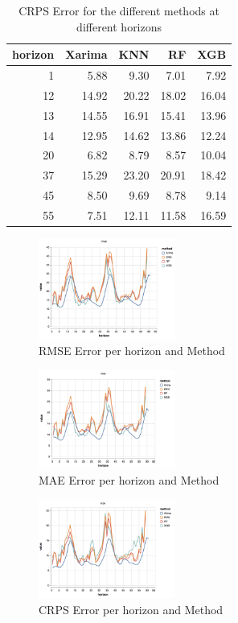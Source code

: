 \documentclass[a4paper,twocolumn,5p]{elsarticle}
\begin{document}
\begin{table}[tbp]
\caption{\label{tab:determ}CRPS Error for the different methods at different
horizons 
}
  \centering
\begin{tabular}{rrrrr}
  \toprule
 horizon & Xarima & KNN & RF & XGB \\ 
  \midrule
  1 & 5.88 & 9.30 & 7.01 & 7.92 \\ 
12 & 14.92 & 20.22 & 18.02 & 16.04 \\ 
13 & 14.55 & 16.91 & 15.41 & 13.96 \\ 
14 & 12.95 & 14.62 & 13.86 & 12.24 \\ 
20 & 6.82 & 8.79 & 8.57 & 10.04 \\ 
37 & 15.29 & 23.20 & 20.91 & 18.42 \\ 
45 & 8.50 & 9.69 & 8.78 & 9.14 \\ 
55 & 7.51 & 12.11 & 11.58 & 16.59 \\ 
   \bottomrule
\end{tabular}
\end{table}

\begin{figure}
  \caption{RMSE Error per horizon and Method}
  \centering
      \includegraphics[width=0.4\textwidth]{results/rmse}
\end{figure}

\begin{figure}
  \caption{MAE Error per horizon and Method}
  \centering
      \includegraphics[width=0.4\textwidth]{results/mae}
\end{figure}

\begin{figure}
  \caption{CRPS Error per horizon and Method}
  \centering
      \includegraphics[width=0.4\textwidth]{results/crps}
\end{figure}
\end{document}
